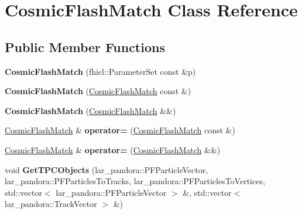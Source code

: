 \hypertarget{classCosmicFlashMatch}{\section{\-Cosmic\-Flash\-Match \-Class \-Reference}
\label{classCosmicFlashMatch}
}
\subsection*{\-Public \-Member \-Functions}
\begin{DoxyCompactItemize}
\item 
\hypertarget{classCosmicFlashMatch_a1b3ff330c64a20c3dd3e22c35f130cc4}{{\bfseries \-Cosmic\-Flash\-Match} (fhicl\-::\-Parameter\-Set const \&p)}\label{classCosmicFlashMatch_a1b3ff330c64a20c3dd3e22c35f130cc4}

\item 
\hypertarget{classCosmicFlashMatch_a75f60bbdcf9889ef76a046d42481a5ba}{{\bfseries \-Cosmic\-Flash\-Match} (\hyperlink{classCosmicFlashMatch}{\-Cosmic\-Flash\-Match} const \&)}\label{classCosmicFlashMatch_a75f60bbdcf9889ef76a046d42481a5ba}

\item 
\hypertarget{classCosmicFlashMatch_a3a6d9b3d9ab6c10f73de3cd12657594d}{{\bfseries \-Cosmic\-Flash\-Match} (\hyperlink{classCosmicFlashMatch}{\-Cosmic\-Flash\-Match} \&\&)}\label{classCosmicFlashMatch_a3a6d9b3d9ab6c10f73de3cd12657594d}

\item 
\hypertarget{classCosmicFlashMatch_a0a7171bfaa0ce33de139b6a6e4482f80}{\hyperlink{classCosmicFlashMatch}{\-Cosmic\-Flash\-Match} \& {\bfseries operator=} (\hyperlink{classCosmicFlashMatch}{\-Cosmic\-Flash\-Match} const \&)}\label{classCosmicFlashMatch_a0a7171bfaa0ce33de139b6a6e4482f80}

\item 
\hypertarget{classCosmicFlashMatch_ad7c726a697d64f903a7e8d360ceba2ed}{\hyperlink{classCosmicFlashMatch}{\-Cosmic\-Flash\-Match} \& {\bfseries operator=} (\hyperlink{classCosmicFlashMatch}{\-Cosmic\-Flash\-Match} \&\&)}\label{classCosmicFlashMatch_ad7c726a697d64f903a7e8d360ceba2ed}

\item 
\hypertarget{classCosmicFlashMatch_a8368e7181e2336eb079cb678113b3911}{void {\bfseries \-Get\-T\-P\-C\-Objects} (lar\-\_\-pandora\-::\-P\-F\-Particle\-Vector, lar\-\_\-pandora\-::\-P\-F\-Particles\-To\-Tracks, lar\-\_\-pandora\-::\-P\-F\-Particles\-To\-Vertices, std\-::vector$<$ lar\-\_\-pandora\-::\-P\-F\-Particle\-Vector $>$ \&, std\-::vector$<$ lar\-\_\-pandora\-::\-Track\-Vector $>$ \&)}\label{classCosmicFlashMatch_a8368e7181e2336eb079cb678113b3911}


\end{DoxyCompactItemize}
